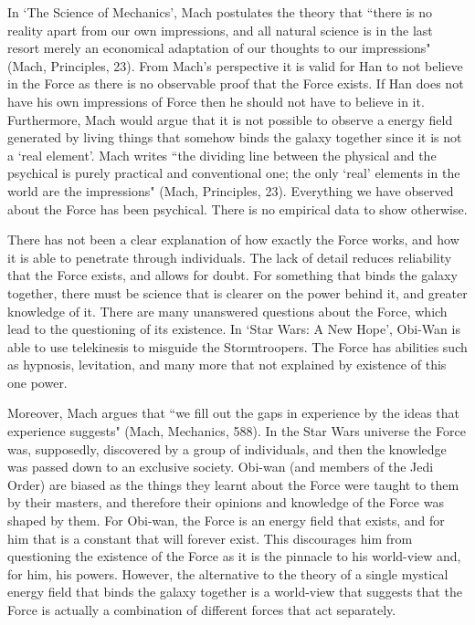 \documentclass[11pt, oneside]{article}
\begin{document}
\par In `The Science of Mechanics', Mach postulates the theory that ``there is no reality apart from our own impressions, and all natural science is in the last resort merely an economical adaptation of our thoughts to our impressions" (Mach, Principles, 23). From Mach's perspective it is valid for Han to not believe in the Force as there is no observable proof that the Force exists. If Han does not have his own impressions of Force then he should not have to believe in it. Furthermore, Mach would argue that it is not possible to observe a energy field generated by living things that somehow binds the galaxy together since it is not a `real element'. Mach writes ``the dividing line between the physical and the psychical is purely practical and conventional one; the only `real' elements in the world are the impressions" (Mach, Principles, 23). Everything we have observed about the Force has been psychical. There is no empirical data to show otherwise.

\par There has not been a clear explanation of how exactly the Force works, and how it is able to penetrate through individuals. The lack of detail reduces reliability that the Force exists, and allows for doubt. For something that binds the galaxy together, there must be science that is clearer on the power behind it, and greater knowledge of it. There are many unanswered questions about the Force, which lead to the questioning of its existence. In `Star Wars: A New Hope', Obi-Wan is able to use telekinesis to misguide the Stormtroopers. The Force has abilities such as hypnosis, levitation, and many more that not explained by existence of this one power. 

\par Moreover, Mach argues that ``we fill out the gaps in experience by the ideas that experience suggests" (Mach, Mechanics, 588). In the Star Wars universe the Force was, supposedly, discovered by a group of individuals, and then the knowledge was passed down to an exclusive society. Obi-wan (and members of the Jedi Order) are biased as the things they learnt about the Force were taught to them by their masters, and therefore their opinions and knowledge of the Force was shaped by them. For Obi-wan, the Force is an energy field that exists, and for him that is a constant that will forever exist. This discourages him from questioning the existence of the Force as it is the pinnacle to his world-view and, for him, his powers. However, the alternative to the theory of a single mystical energy field that binds the galaxy together is a world-view that suggests that the Force is actually a combination of different forces that act separately.
\end{document}
